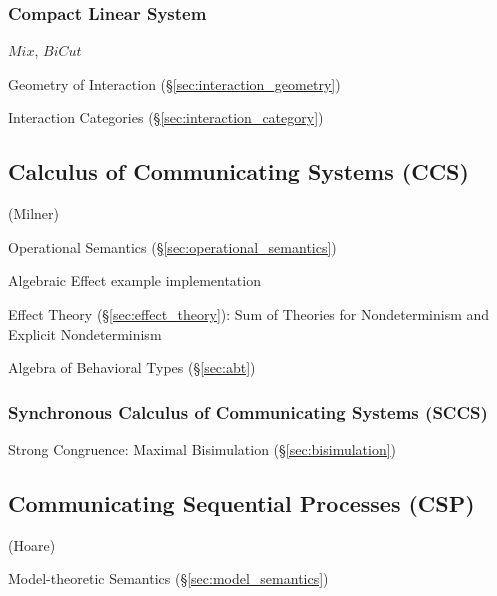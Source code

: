 \subsubsection{Compact Linear System}\label{sec:compact_linear_system}

\cite{abramsky-gay-nagarajan96}

$Mix$, $BiCut$

\cite{wadler12}

Geometry of Interaction (\S\ref{sec:interaction_geometry})

Interaction Categories (\S\ref{sec:interaction_category})



\subsection{Calculus of Communicating Systems (CCS)}\label{sec:ccs}

(Milner)

Operational Semantics (\S\ref{sec:operational_semantics})

Algebraic Effect example implementation \cite{plotkin-pretnar13}

Effect Theory (\S\ref{sec:effect_theory}): Sum of Theories for
Nondeterminism and Explicit Nondeterminism \cite{plotkin-pretnar13}

\fist Algebra of Behavioral Types (\S\ref{sec:abt})



\subsubsection{Synchronous Calculus of Communicating Systems (SCCS)}
\label{sec:sccs}

Strong Congruence: Maximal Bisimulation (\S\ref{sec:bisimulation})
\cite{aczel88}



\subsection{Communicating Sequential Processes (CSP)}\label{sec:csp}

(Hoare)

Model-theoretic Semantics (\S\ref{sec:model_semantics})

